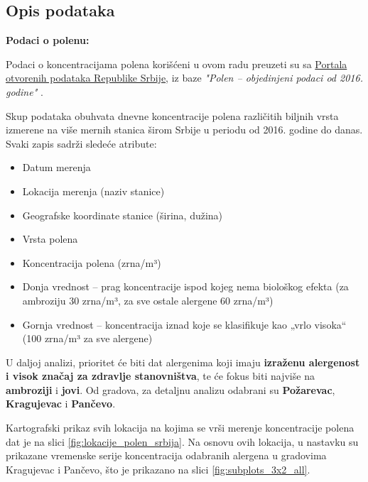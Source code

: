 \documentclass[12pt]{article}
\begin{document}
\subsection{Opis podataka}
\textbf{Podaci o polenu:}

Podaci o koncentracijama polena korišćeni u ovom radu preuzeti su sa \href{https://data.gov.rs/sr/datasets/polen-objedinjeni-podatsi-od-2016-godine/}{Portala otvorenih podataka Republike Srbije}, iz baze \textit{"Polen – objedinjeni podaci od 2016. godine"} \cite{rhmz2023}.

Skup podataka obuhvata dnevne koncentracije polena različitih biljnih vrsta izmerene na više mernih stanica širom Srbije u periodu od 2016. godine do danas. Svaki zapis sadrži sledeće atribute:
\begin{itemize}[noitemsep]
\item Datum merenja
\item Lokacija merenja (naziv stanice)
\item Geografske koordinate stanice (širina, dužina)
\item Vrsta polena
\item Koncentracija polena (zrna/m³)
\item Donja vrednost – prag koncentracije ispod kojeg nema biološkog efekta (za ambroziju 30 zrna/m³, za sve ostale alergene 60 zrna/m³) \cite{damato2007}
\item Gornja vrednost – koncentracija iznad koje se klasifikuje kao „vrlo visoka“ (100 zrna/m³ za sve alergene) \cite{who2003}
\end{itemize}
U daljoj analizi, prioritet će biti dat alergenima koji imaju \textbf{izraženu alergenost i visok značaj za zdravlje stanovništva}, te će fokus biti najviše na \textbf{ambroziji} i \textbf{jovi}. Od gradova, za detaljnu analizu odabrani su \textbf{Požarevac}, \textbf{Kragujevac} i \textbf{Pančevo}.

Kartografski prikaz svih lokacija na kojima se vrši merenje koncentracije polena dat je na slici \ref{fig:lokacije_polen_srbija}. 
Na osnovu ovih lokacija, u nastavku su prikazane vremenske serije koncentracija odabranih alergena u gradovima Kragujevac i Pančevo, 
što je prikazano na slici \ref{fig:subplots_3x2_all}.
\end{document}
